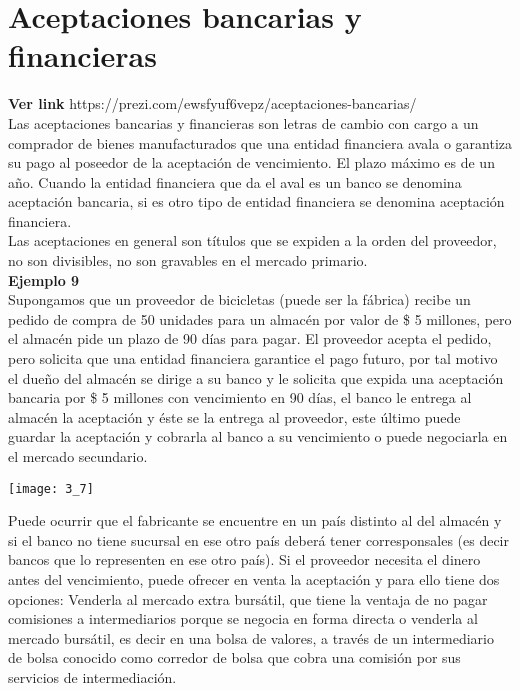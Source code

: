 	
	\section{Aceptaciones bancarias y financieras}
	\textbf{Ver link} https://prezi.com/ewsfyuf6vepz/aceptaciones-bancarias/\\
	
	Las aceptaciones bancarias y financieras son letras de cambio con cargo a un comprador de bienes manufacturados que una entidad financiera avala o garantiza su pago al poseedor de la aceptación de vencimiento. El plazo máximo es de un año. Cuando la entidad financiera que da el aval es un banco se denomina aceptación bancaria, si es otro tipo de entidad financiera se denomina aceptación financiera.\\
	
	Las aceptaciones en general son títulos que se expiden a la orden del proveedor, no son divisibles, no son gravables en el mercado primario.\\
	
	\textbf{Ejemplo 9}\\
	Supongamos que un proveedor de bicicletas (puede ser la fábrica) recibe un pedido de compra de 50 unidades para un almacén por valor de \$ 5 millones, pero el almacén pide un plazo de 90 días para pagar. El proveedor acepta el pedido, pero solicita que una entidad financiera garantice el pago futuro, por tal motivo el dueño del almacén se dirige a su banco y le solicita que expida una aceptación bancaria por \$ 5 millones con vencimiento en 90 días, el banco le entrega al almacén la aceptación y éste se la entrega al proveedor, este último puede guardar la aceptación y cobrarla al banco a su vencimiento o puede negociarla en el mercado secundario.\\
	
	\begin{center}
		\texttt{[image: 3\_7]}
	\end{center}	
	
	Puede ocurrir que el fabricante se encuentre en un país distinto al del almacén y si el banco no tiene sucursal en ese otro país deberá tener corresponsales (es decir bancos que lo representen en ese otro país). Si el proveedor necesita el dinero antes del vencimiento, puede ofrecer en venta la aceptación y para ello tiene dos opciones: Venderla al mercado extra bursátil, que tiene la ventaja de no pagar comisiones a intermediarios porque se negocia en forma directa o venderla al mercado bursátil, es decir en una bolsa de valores, a través de un intermediario de bolsa conocido como corredor de bolsa que cobra una comisión por sus servicios de intermediación.\\
	
